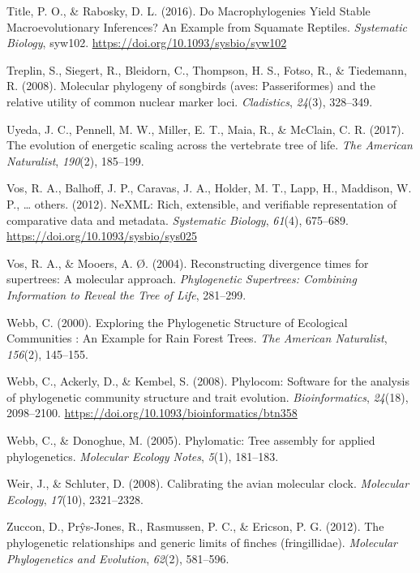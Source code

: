 \documentclass[english,man]{apa6}
\begin{document}
\leavevmode\hypertarget{ref-title2016macrophylogenies}{}%
Title, P. O., \& Rabosky, D. L. (2016). Do Macrophylogenies Yield Stable Macroevolutionary Inferences? An Example from Squamate Reptiles. \emph{Systematic Biology}, syw102. \url{https://doi.org/10.1093/sysbio/syw102}

\leavevmode\hypertarget{ref-treplin2008molecular}{}%
Treplin, S., Siegert, R., Bleidorn, C., Thompson, H. S., Fotso, R., \& Tiedemann, R. (2008). Molecular phylogeny of songbirds (aves: Passeriformes) and the relative utility of common nuclear marker loci. \emph{Cladistics}, \emph{24}(3), 328--349.

\leavevmode\hypertarget{ref-uyeda2017evolution}{}%
Uyeda, J. C., Pennell, M. W., Miller, E. T., Maia, R., \& McClain, C. R. (2017). The evolution of energetic scaling across the vertebrate tree of life. \emph{The American Naturalist}, \emph{190}(2), 185--199.

\leavevmode\hypertarget{ref-vos2012nexml}{}%
Vos, R. A., Balhoff, J. P., Caravas, J. A., Holder, M. T., Lapp, H., Maddison, W. P., \ldots{} others. (2012). NeXML: Rich, extensible, and verifiable representation of comparative data and metadata. \emph{Systematic Biology}, \emph{61}(4), 675--689. \url{https://doi.org/10.1093/sysbio/sys025}

\leavevmode\hypertarget{ref-vos2004reconstructing}{}%
Vos, R. A., \& Mooers, A. Ø. (2004). Reconstructing divergence times for supertrees: A molecular approach. \emph{Phylogenetic Supertrees: Combining Information to Reveal the Tree of Life}, 281--299.

\leavevmode\hypertarget{ref-Webb2000}{}%
Webb, C. (2000). Exploring the Phylogenetic Structure of Ecological Communities : An Example for Rain Forest Trees. \emph{The American Naturalist}, \emph{156}(2), 145--155.

\leavevmode\hypertarget{ref-Webb2008}{}%
Webb, C., Ackerly, D., \& Kembel, S. (2008). Phylocom: Software for the analysis of phylogenetic community structure and trait evolution. \emph{Bioinformatics}, \emph{24}(18), 2098--2100. \url{https://doi.org/10.1093/bioinformatics/btn358}

\leavevmode\hypertarget{ref-webb2005phylomatic}{}%
Webb, C., \& Donoghue, M. (2005). Phylomatic: Tree assembly for applied phylogenetics. \emph{Molecular Ecology Notes}, \emph{5}(1), 181--183.

\leavevmode\hypertarget{ref-weir2008calibrating}{}%
Weir, J., \& Schluter, D. (2008). Calibrating the avian molecular clock. \emph{Molecular Ecology}, \emph{17}(10), 2321--2328.

\leavevmode\hypertarget{ref-zuccon2012phylogenetic}{}%
Zuccon, D., Prŷs-Jones, R., Rasmussen, P. C., \& Ericson, P. G. (2012). The phylogenetic relationships and generic limits of finches (fringillidae). \emph{Molecular Phylogenetics and Evolution}, \emph{62}(2), 581--596.

\endgroup
\end{document}
